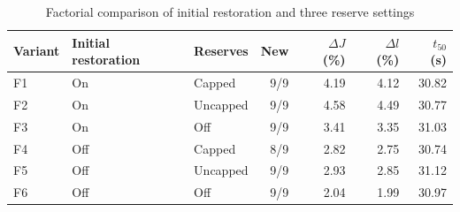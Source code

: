 \begin{table}[!t]
\centering\caption{Factorial comparison of initial restoration and three reserve settings}
\label{tab:factorial}
\footnotesize\begin{tabular}{lllrrrr}
\toprule
Variant & Initial restoration & Reserves & New & $\Delta J$ (\%) & $\Delta l$ (\%) & $t_{50}$ (s)\\
\midrule
F1 & On & Capped & 9/9 & 4.19 & 4.12 & 30.82\\
F2 & On & Uncapped & 9/9 & 4.58 & 4.49 & 30.77\\
F3 & On & Off & 9/9 & 3.41 & 3.35 & 31.03\\
F4 & Off & Capped & 8/9 & 2.82 & 2.75 & 30.74\\
F5 & Off & Uncapped & 9/9 & 2.93 & 2.85 & 31.12\\
F6 & Off & Off & 9/9 & 2.04 & 1.99 & 30.97\\
\bottomrule\end{tabular}
\end{table}
